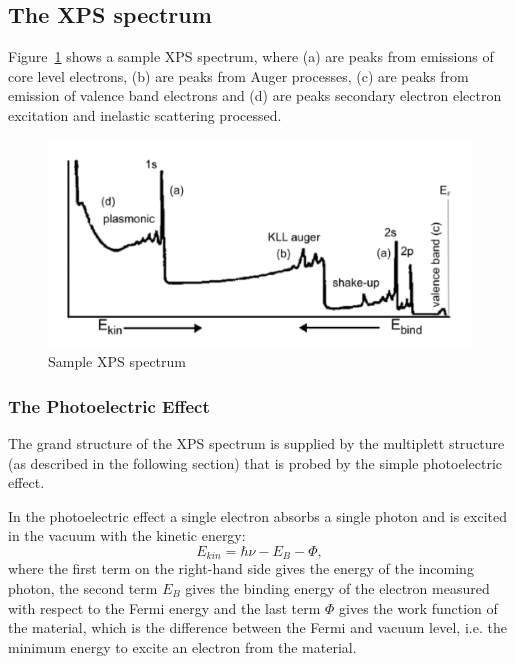 \documentclass[a4paper,10pt]{scrartcl}
\begin{document}
\subsection{The XPS spectrum}

Figure~\ref{fig:spectrum} shows a sample XPS spectrum, where (a) are peaks from emissions of core level electrons, (b) are peaks from Auger processes, (c) are peaks from emission of valence band electrons and (d) are peaks secondary electron electron excitation and inelastic scattering processed.

\begin{figure}
\centering
\includegraphics[scale=0.4]{img/spectrum}
\caption{Sample XPS spectrum \label{fig:spectrum}}
\end{figure}

\subsubsection{The Photoelectric Effect}

The grand structure of the XPS spectrum is supplied by the multiplett structure (as described in the following section) that is probed by the simple photoelectric effect.

In the photoelectric effect a single electron absorbs a single photon and is excited in the vacuum with the kinetic energy:
\begin{equation}
E_{kin} = \hbar \nu - E_{B} - \Phi,
\end{equation}
where the first term on the right-hand side gives the energy of the incoming photon, the second term $E_{B}$ gives the binding energy of the electron measured with respect to the Fermi energy and the last term $\Phi$ gives the work function of the material, which is the difference between the Fermi and vacuum level, i.e. the minimum energy to excite an electron from the material.
\end{document}

